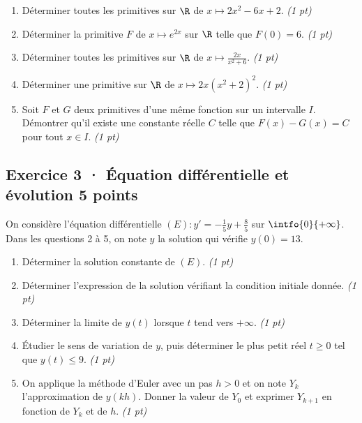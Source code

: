 \begin{enumerate}

\item Déterminer toutes les primitives sur $\R$ de $x\mapsto 2x^2-6x+2$. \hfill\textit{(1 pt)}

\item Déterminer la primitive $F$ de $x\mapsto e^{2x}$ sur $\R$ telle que $F(0)=6$. \hfill\textit{(1 pt)}

\item Déterminer toutes les primitives sur $\R$ de $x\mapsto\frac{2x}{x^2+6}$. \hfill\textit{(1 pt)}

\item Déterminer une primitive sur $\R$ de $x\mapsto2x(x^2+2)^{2}$. \hfill\textit{(1 pt)}

\item Soit $F$ et $G$ deux primitives d'une même fonction sur un intervalle $I$. Démontrer qu'il existe une constante réelle $C$ telle que $F(x)-G(x)=C$ pour tout $x\in I$. \hfill\textit{(1 pt)}

\end{enumerate}

\mxnewpage{}

\subsection*{Exercice 3 · Équation différentielle et évolution \hfill 5 points}On considère l'équation différentielle $(E):y'=-\frac1{5}y+\frac{8}{5}$ sur $\intfo{0}{+\infty}$. Dans les questions 2 à 5, on note $y$ la solution qui vérifie $y(0)=13$.

\begin{enumerate}

\item Déterminer la solution constante de $(E)$. \hfill\textit{(1 pt)}

\item Déterminer l'expression de la solution vérifiant la condition initiale donnée. \hfill\textit{(1 pt)}

\item Déterminer la limite de $y(t)$ lorsque $t$ tend vers $+\infty$. \hfill\textit{(1 pt)}

\item Étudier le sens de variation de $y$, puis déterminer le plus petit réel $t\ge0$ tel que $y(t)\le9$. \hfill\textit{(1 pt)}

\item On applique la méthode d'Euler avec un pas $h>0$ et on note $Y_k$ l'approximation de $y(kh)$. Donner la valeur de $Y_0$ et exprimer $Y_{k+1}$ en fonction de $Y_k$ et de $h$. \hfill\textit{(1 pt)}

\end{enumerate}

